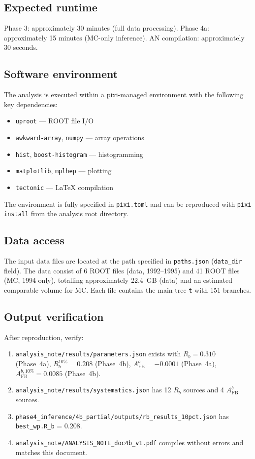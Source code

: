 \documentclass[11pt,a4paper]{article}
\begin{document}
\subsection{Expected runtime}

Phase 3: approximately 30 minutes (full data processing).
Phase 4a: approximately 15 minutes (MC-only inference).
AN compilation: approximately 30 seconds.

\subsection{Software environment}

The analysis is executed within a pixi-managed environment with the following key
dependencies:
\begin{itemize}
\item \texttt{uproot} --- ROOT file I/O
\item \texttt{awkward-array}, \texttt{numpy} --- array operations
\item \texttt{hist}, \texttt{boost-histogram} --- histogramming
\item \texttt{matplotlib}, \texttt{mplhep} --- plotting
\item \texttt{tectonic} --- LaTeX compilation
\end{itemize}

The environment is fully specified in \texttt{pixi.toml} and can be reproduced
with \texttt{pixi install} from the analysis root directory.

\subsection{Data access}

The input data files are located at the path specified in \texttt{paths.json}
(\texttt{data\_dir} field). The data consist of 6 ROOT files (data, 1992--1995)
and 41 ROOT files (MC, 1994 only), totalling approximately 22.4~GB (data) and
an estimated comparable volume for MC. Each file contains the main tree \texttt{t}
with 151 branches.

\subsection{Output verification}

After reproduction, verify:
\begin{enumerate}
\item \texttt{analysis\_note/results/parameters.json} exists with
$R_b = 0.310$ (Phase~4a), $R_b^{10\%} = 0.208$ (Phase~4b),
$A_\mathrm{FB}^b = -0.0001$ (Phase~4a), $A_\mathrm{FB}^{b,10\%} = 0.0085$ (Phase~4b).
\item \texttt{analysis\_note/results/systematics.json} has 12 $R_b$ sources
and 4 $A_\mathrm{FB}^b$ sources.
\item \texttt{phase4\_inference/4b\_partial/outputs/rb\_results\_10pct.json} has
\texttt{best\_wp.R\_b} = 0.208.
\item \texttt{analysis\_note/ANALYSIS\_NOTE\_doc4b\_v1.pdf} compiles without
errors and matches this document.
\end{enumerate}
\end{document}

